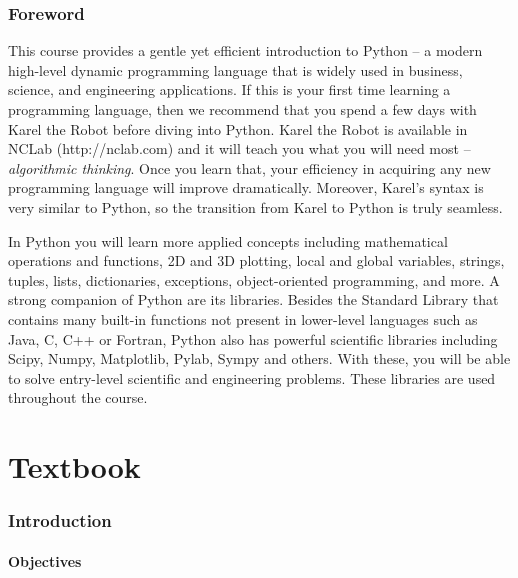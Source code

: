 \documentclass[article,A4,12pt]{llncs}
\begin{document}
\pagestyle{plain}
\setcounter{page}{1}
\section*{Foreword}
This course provides a gentle yet efficient introduction to Python -- 
a modern high-level dynamic programming language that is widely used in business, 
science, and engineering applications. If this is your first time learning 
a programming language, then we recommend that you spend a few days with 
Karel the Robot before diving into Python. Karel the Robot is available 
in NCLab (http://nclab.com) and it will teach you what you will need most --
{\em algorithmic 
thinking}. Once you learn that, your efficiency in acquiring any new programming language
will improve dramatically. Moreover, Karel's syntax is very similar to Python, 
so the transition from Karel to Python is truly seamless.

In Python you will learn more applied concepts including mathematical operations
and functions, 2D and 3D plotting, local and global variables, strings, tuples, lists, dictionaries, 
exceptions, object-oriented programming, and more. 
A strong companion of Python are its libraries. Besides the Standard Library that
contains many built-in functions not present in lower-level languages such as 
Java, C, C++ or Fortran, Python also has powerful scientific libraries including 
Scipy, Numpy, Matplotlib, Pylab, Sympy and others. With these, you will be able to 
solve entry-level scientific and engineering problems. These libraries are used
throughout the course.  


\part{Textbook}

\setcounter{section}{0}
\section{Introduction}

\subsection{Objectives}
\end{document}
